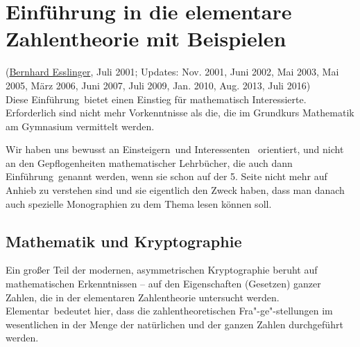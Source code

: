 
\begin{refsegment}

	
\setcounter{satz}{0}
\setcounter{definition}{0}

\hypertarget{Chapter_ElementaryNT}{}
\chapter{Einführung in die elementare Zahlentheorie mit Beispielen}
\label{Chapter_ElementaryNT}
(\hyperlink{author_Bernhard-Esslinger}{Bernhard Esslinger}, Juli 2001;
 Updates: Nov. 2001, Juni 2002, Mai 2003,
 Mai 2005, März 2006, Juni 2007, Juli 2009, Jan. 2010, Aug. 2013, Juli 2016)\\

Diese \glqq Einführung\grqq~bietet einen Einstieg für mathematisch
Interessierte. Erforderlich sind nicht mehr Vorkenntnisse als die, die im
Grundkurs Mathematik am Gymnasium vermittelt werden.\par
Wir haben uns bewusst an \glqq Einsteigern\grqq~und \glqq Interessenten\grqq~
orientiert, und nicht an den Gepflogenheiten mathematischer Lehrbücher, die
auch dann \glqq Einführung\grqq~genannt werden, wenn sie schon auf der 5. Seite
nicht mehr auf Anhieb zu verstehen sind und sie eigentlich den Zweck haben, dass
man danach auch spezielle Monographien zu dem Thema lesen können soll.



\section{Mathematik und Kryptographie}
Ein großer Teil der modernen, asymmetrischen Kryptographie beruht auf
mathematischen Erkenntnissen -- auf den Eigenschaften (\glqq Gesetzen\grqq)
ganzer Zahlen, die in der elementaren 
Zahlentheorie untersucht werden. \glqq Elementar\grqq\ bedeutet hier,
dass die zahlentheoretischen Fra"-ge"-stellungen im wesentlichen
in der Menge der natürlichen und der ganzen Zahlen durchgeführt werden.


\end{refsegment}
